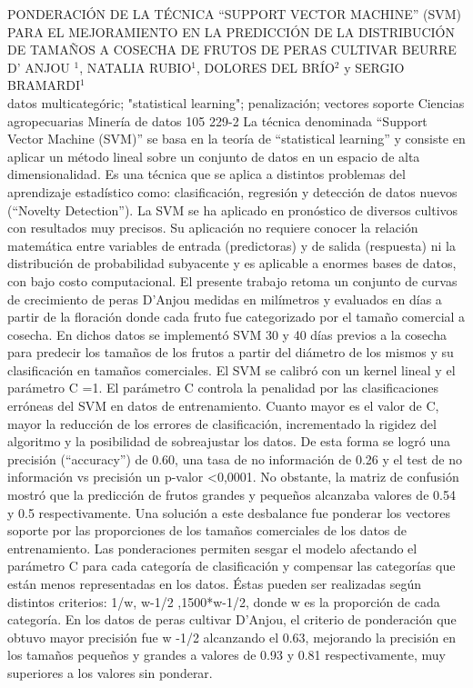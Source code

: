 \A
{PONDERACIÓN DE LA TÉCNICA “SUPPORT VECTOR MACHINE” (SVM) PARA EL MEJORAMIENTO EN LA PREDICCIÓN DE LA DISTRIBUCIÓN DE TAMAÑOS A COSECHA DE FRUTOS DE PERAS CULTIVAR BEURRE D’ ANJOU}
{$^1$, NATALIA RUBIO$^1$, DOLORES DEL BRÍO$^2$ y SERGIO BRAMARDI$^1$}
{
\\}
{datos multicategóric; "statistical learning"; penalización; vectores soporte} 
 {Ciencias agropecuarias} 
 {Minería de datos} 
 {105} 
 {229-2}
{La técnica denominada “Support Vector Machine (SVM)” se basa en la teoría de “statistical learning” y consiste en aplicar un método lineal sobre un conjunto de datos en un espacio de alta dimensionalidad. Es una técnica que se aplica a distintos problemas del aprendizaje estadístico como: clasificación, regresión y detección de datos nuevos (“Novelty Detection”). La SVM se ha aplicado en pronóstico de diversos cultivos con resultados muy precisos. Su aplicación no requiere conocer la relación matemática entre variables de entrada (predictoras) y de salida (respuesta) ni la distribución de probabilidad subyacente y es aplicable a enormes bases de datos, con bajo costo computacional. El presente trabajo retoma un conjunto de curvas de crecimiento de peras D’Anjou medidas en milímetros y evaluados en días a partir de la floración donde cada fruto fue categorizado por el tamaño comercial a cosecha. En dichos datos se implementó SVM 30 y 40 días previos a la cosecha para predecir los tamaños de los frutos a partir del diámetro de los mismos y su clasificación en tamaños comerciales. El SVM se calibró con un kernel lineal y el parámetro C =1. El parámetro C controla la penalidad por las clasificaciones erróneas del SVM en datos de entrenamiento. Cuanto mayor es el valor de C, mayor la reducción de los errores de clasificación, incrementado la rigidez del algoritmo y la posibilidad de sobreajustar los datos. De esta forma se logró una precisión (“accuracy”) de 0.60, una tasa de no información de 0.26 y el test de no información vs precisión un p-valor <0,0001. No obstante, la matriz de confusión mostró que la predicción de frutos grandes y pequeños alcanzaba valores de 0.54 y 0.5 respectivamente. Una solución a este desbalance fue ponderar los vectores soporte por las proporciones de los tamaños comerciales de los datos de entrenamiento. Las ponderaciones permiten sesgar el modelo afectando el parámetro C para cada categoría de clasificación y compensar las categorías que están menos representadas en los datos. Éstas pueden ser realizadas según distintos criterios: 1/w, w-1/2 ,1500*w-1/2, donde w es la proporción de cada categoría. En los datos de peras cultivar D’Anjou, el criterio de ponderación que obtuvo mayor precisión fue w -1/2 alcanzando el 0.63, mejorando la precisión en los tamaños pequeños y grandes a valores de 0.93 y 0.81 respectivamente, muy superiores a los valores sin ponderar.}
